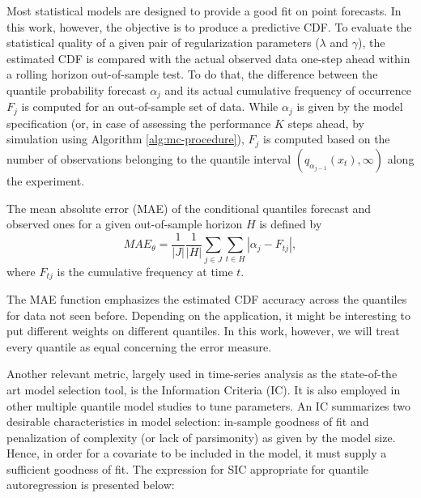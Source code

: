 


Most statistical models are designed to provide a good fit on point forecasts. In this work, however, the objective is to produce a predictive CDF. To evaluate the statistical quality of a given pair of regularization parameters ($\lambda$ and $\gamma$), the estimated CDF is compared with the actual observed data one-step ahead within a rolling horizon out-of-sample test. To do that, the difference between the quantile probability forecast $\alpha_j$ and its actual cumulative frequency of occurrence $F_j$ is computed for an out-of-sample set of data. While $\alpha_j$ is given by the model specification (or, in case of assessing the performance $K$ steps ahead, by simulation using Algorithm \ref{alg:mc-procedure}), $F_j$ is computed based on the number of observations belonging to the quantile interval $(q_{\alpha_{j-1}}(x_t), \infty)$ along the experiment.


The mean absolute error (MAE) of the conditional quantiles forecast and observed ones for a given out-of-sample horizon $H$ is defined by
\begin{equation}
MAE_{\theta}= \frac{1}{|J|} \frac{1}{|H|}  \sum_{j \in J} \sum_{t \in H} \left| \alpha_j -  F_{tj}  \right|,
\label{eq:MAE}
\end{equation}
where $F_{tj}$ is the cumulative frequency at time $t$.

The MAE function emphasizes the estimated CDF accuracy across the quantiles for data not seen before. Depending on the application, it might be interesting to put different weights on different quantiles. In this work, however, we will treat every quantile as equal concerning the error measure.



Another relevant metric, largely used in time-series analysis as the state-of-the art model selection tool, is the Information Criteria (IC). It is also employed in other multiple quantile model studies \cite{zou_regularized_2008, jiang_interquantile_2014} to tune parameters. An IC summarizes two desirable characteristics in model selection: in-sample goodness of fit and penalization of complexity (or lack of parsimonity) as given by the model size. Hence, in order for a covariate to be included in the model, it must supply a sufficient goodness of fit. The expression for SIC appropriate for quantile autoregression is presented below:

